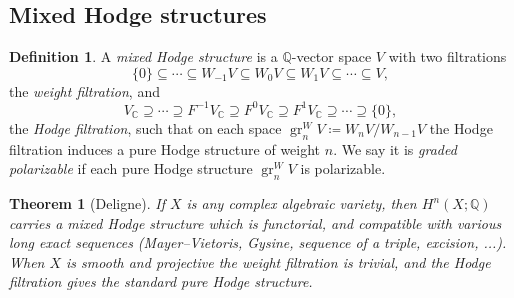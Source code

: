 \documentclass{article}
\newtheorem*{theorem}{Theorem}
\theoremstyle{definition}
\newtheorem*{definition}{Definition}
\DeclareMathOperator{\gr}{gr}
\newcommand{\Q}{\mathbb{Q}}
\newcommand{\C}{\mathbb{C}}
\begin{document}
\subsection*{Mixed Hodge structures}

\begin{definition}
    A \emph{mixed Hodge structure} is a $\Q$-vector space $V$ with two
    filtrations
    \begin{equation*}
        \{0\}\subseteq\cdots\subseteq
            W_{-1}V\subseteq W_0V\subseteq W_1V
            \subseteq\cdots\subseteq V,
    \end{equation*}
    the \emph{weight filtration}, and
    \begin{equation*}
        V_\C\supseteq\cdots\supseteq
            F^{-1}V_\C\supseteq F^0V_\C\supseteq F^1V_\C
            \supseteq\cdots\supseteq\{0\},
    \end{equation*}
    the \emph{Hodge filtration}, such that on each space
    $\gr_n^WV\coloneq W_nV/W_{n-1}V$ the Hodge filtration induces a pure Hodge
    structure of weight $n$. We say it is \emph{graded polarizable} if each pure
    Hodge structure $\gr_n^WV$ is polarizable.
\end{definition}

\begin{theorem}[Deligne]
    If $X$ is any complex algebraic variety, then $H^n(X;\Q)$ carries a mixed
    Hodge structure which is functorial, and compatible with various long exact
    sequences (Mayer--Vietoris, Gysine, sequence of a triple, excision, ...).
    When $X$ is smooth and projective the weight filtration is trivial, and the
    Hodge filtration gives the standard pure Hodge structure.
\end{theorem}
\end{document}
